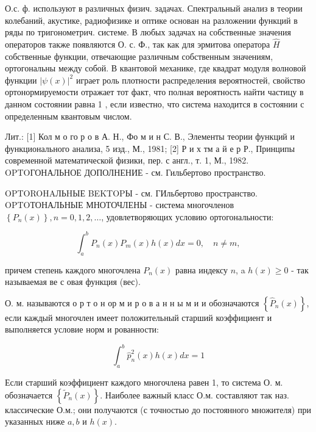 \documentclass[10pt]{article}
\begin{document}
О.с. ф. используют в различных физич. задачах. Спектральный анализ в теории колебаний, акустике, радиофизике и оптике основан на разложении функций в ряды по тригонометрич. системе. В любых задачах на собственные значения операторов также появляются О. с. Ф., так как для эрмитова оператора $\hat{H}$ собственные функции, отвечающие различным собственным значениям, ортогональны между собой. В квантовой механике, где квадрат модуля волновой функции $|\psi(x)|^{2}$ играет роль плотности распределения вероятностей, свойство ортонормируемости отражает тот факт, что полная вероятность найти частицу в данном состоянии равна 1 , если известно, что система находится в состоянии с определенным квантовым числом.



Лит.: [1] Кол м о го р о в А. Н., Фо м и н С. В., Элементы теории функций и функционального анализа, 5 изд., М., 1981; [2] Р и х тм а й е р Р., Принципы современной математической физики, пер. с англ., т. 1, М., 1982. OPTOГОНАЛЬНОЕ ДОПОЛНЕНИЕ - см. Гильбертово пространство.



OPTOROHAЛЬHЫЕ BEKTOPЫ - см. ГИльбертово пространство. OPTOТОНАЛЬНЫЕ МНОТОЧЛЕНЫ - система многочленов $\left\{P_{n}(x)\right\}, n=0,1,2, \ldots$, удовлетворяющих условию ортогональности:



\[

\int_{a}^{b} P_{n}(x) P_{m}(x) h(x) d x=0, \quad n \neq m,

\]



причем степень каждого многочлена $P_{n}(x)$ равна индексу $n$, a $h(x) \geqslant 0$ - так называемая ве с овая функция (вес).



О. м. называются о р т о н ор м и р о в а н н ы м и и обозначаются $\left\{\hat{P}_{n}(x)\right\}$, если каждый многочлен имеет положительный старший коэффициент и выполняется условие норм и рованности:



\[

\int_{a}^{b} \hat{p}_{n}^{2}(x) h(x) d x=1

\]



Если старший коэффициент каждого многочлена равен 1, то система О. м. обозначается $\left\{\widetilde{P}_{n}(x)\right\}$. Наиболее важный класс О.м. составляют так наз. классические О.м.; они получаются (с точностью до постоянного множителя) при указанных ниже $a, b$ и $h(x)$.
\end{document}
